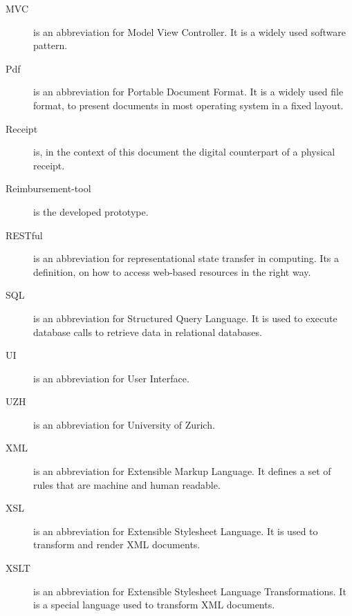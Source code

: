 \begin{description}
    \item[MVC] is an abbreviation for Model View Controller. It is a widely used software pattern.
    \item[Pdf] is an abbreviation for Portable Document Format. It is a widely used file format, to present documents in most operating system in a fixed layout.
    \item[Receipt] is, in the context of this document the digital counterpart of a physical receipt.
    \item[Reimbursement-tool] is the developed prototype.
    \item[RESTful] is an abbreviation for representational state transfer in computing. Its a definition, on how to access web-based resources in the right way.
    \item[SQL] is an abbreviation for Structured Query Language. It is used to execute database calls to retrieve data in relational databases.
    \item[UI] is an abbreviation for User Interface. 
    \item[UZH] is an abbreviation for University of Zurich.
    \item[XML] is an abbreviation for Extensible Markup Language. It defines a set of rules that are machine and human readable.
    \item[XSL] is an abbreviation for Extensible Stylesheet Language. It is used to transform and render XML documents.
    \item[XSLT] is an abbreviation for Extensible Stylesheet Language Transformations. It is a special language used to transform XML documents.
\end{description}
